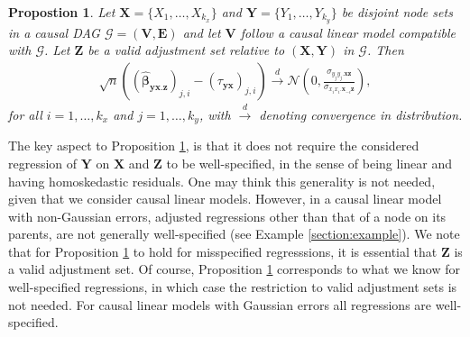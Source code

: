 \documentclass[11pt,a4paper]{article}
\newtheorem{Proposition}[Satz]{Propostion}
\theoremstyle{definition}
\theoremstyle{remark}
\newcommand{\g}[1][G]{\mathcal{#1}}
\begin{document}

\begin{Proposition}
	Let $\mathbf{X}=\{X_1,\dots,X_{k_x}\}$ and $\mathbf{Y}=\{Y_1,\dots,Y_{k_y}\}$ be disjoint node sets in a causal DAG $\g=(\mathbf{V},\mathbf{E})$ and let $\mathbf{V}$ follow a causal linear model compatible with $\g$. Let $\mathbf{Z}$ be a valid adjustment set relative to $(\mathbf{X},\mathbf{Y})$ in $\g$. Then 
	\begin{align}
	\sqrt{n} ((\boldsymbol{\hat{\beta}}_{\mathbf{yx}.\mathbf{z}})_{j,i} - (\tau_{\mathbf{yx}})_{j,i}) \xrightarrow{d} \mathcal{N}(0, \frac{\sigma_{y_jy_j.\mathbf{xz}}}{\sigma_{x_ix_i.\mathbf{x}_{-i}\mathbf{z}}}), \nonumber 
	\end{align}
	for all $i = 1,\dots,k_x $ and $j = 1, \dots,k_y$, with $\xrightarrow{d}$ denoting convergence in distribution.
	
	\label{avarDAG}
\end{Proposition}

The key aspect to Proposition \ref{avarDAG}, is that it does not require the considered regression of $\mathbf{Y}$ on $\mathbf{X}$ and $\mathbf{Z}$ to be well-specified, in the sense of being linear and having homoskedastic residuals. One may think this generality is not needed, given that we consider causal linear models. However, in a causal linear model with non-Gaussian errors, adjusted regressions other than that of a node on its parents, are not generally well-specified (see Example \ref{section:example}). 
We note that for Proposition \ref{avarDAG} to hold for misspecified regresssions, it is essential that $\mathbf{Z}$ is a valid adjustment set. Of course, Proposition \ref{avarDAG} corresponds to what we know for well-specified regressions, in which case the restriction to valid adjustment sets is not needed. For causal linear models with Gaussian errors all regressions are well-specified.
\end{document}
